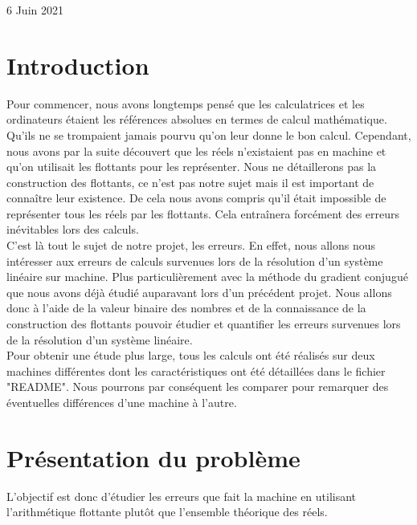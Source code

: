 \documentclass[12,french]{report}
\begin{document}
\begin{titlepage}
\begin{center}
	\vfill
	{\large 6 Juin 2021}
\end{center}
\end{titlepage}

\tableofcontents


\renewcommand{\chaptername}{}
\chapter*{Introduction} %
Pour commencer, nous avons longtemps pensé que les calculatrices et les ordinateurs étaient les références absolues en termes de calcul mathématique. Qu'ils ne se trompaient jamais pourvu qu'on leur donne le bon calcul. Cependant, nous avons par la suite découvert que les réels n'existaient pas en machine et qu'on utilisait les flottants pour les représenter. Nous ne détaillerons pas la construction des flottants, ce n'est pas notre sujet mais il est important de connaître leur existence. De cela nous avons compris qu'il était impossible de représenter tous les réels par les flottants. Cela entraînera forcément des erreurs inévitables lors des calculs. \\

C'est là tout le sujet de notre projet, les erreurs. En effet, nous allons nous intéresser aux erreurs de calculs survenues lors de la résolution d'un système linéaire sur machine. Plus particulièrement avec la méthode du gradient conjugué que nous avons déjà étudié auparavant lors d'un précédent projet. Nous allons donc à l'aide de la valeur binaire des nombres et de la connaissance de la construction des flottants pouvoir étudier et quantifier les erreurs survenues lors de la résolution d'un système linéaire. \\

Pour obtenir une étude plus large, tous les calculs ont été réalisés sur deux machines différentes dont les caractéristiques ont été détaillées dans le fichier "README". Nous pourrons par conséquent les comparer pour remarquer des éventuelles différences d'une machine à l'autre.

\chapter{Présentation du problème} %

L'objectif est donc d'étudier les erreurs que fait la machine en utilisant l'arithmétique flottante plutôt que l'ensemble théorique des réels.\\
\end{document}
